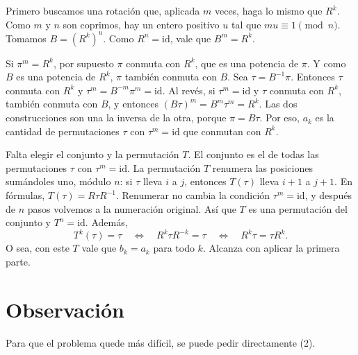 \documentclass[11pt]{amsproc}
\newcommand{\id}{\mathrm{id}}
\begin{document}
Primero buscamos una rotación que, aplicada $m$ veces, haga lo mismo que
$R^k$. Como $m$ y $n$ son coprimos, hay un entero positivo $u$ tal que
$mu\equiv 1\pmod n$. Tomamos $B=(R^k)^u$. Como $R^n=\id$, vale que
$B^m=R^k$.

Si $\pi^m=R^k$, por supuesto $\pi$ conmuta con $R^k$, que es una potencia de
$\pi$. Y como $B$ es una potencia de $R^k$, $\pi$ también conmuta con $B$. Sea
$\tau=B^{-1}\pi$. Entonces $\tau$ conmuta con $R^k$ y
$\tau^m=B^{-m}\pi^m=\id$. Al revés, si $\tau^m=\id$ y $\tau$ conmuta con
$R^k$, también conmuta con $B$, y entonces $(B\tau)^m=B^m\tau^m=R^k$. Las dos
construcciones son una la inversa de la otra, porque $\pi=B\tau$. Por eso,
$a_k$ es la cantidad de permutaciones $\tau$ con $\tau^m=\id$ que conmutan con
$R^k$.

Falta elegir el conjunto y la permutación $T$. El conjunto es el de todas las
permutaciones $\tau$ con $\tau^m=\id$. La permutación $T$ renumera las
posiciones sumándoles uno, módulo $n$: si $\tau$ lleva $i$ a $j$, entonces
$T(\tau)$ lleva $i+1$ a $j+1$. En fórmulas, $T(\tau)=R\tau R^{-1}$.
Renumerar no cambia la condición $\tau^m=\id$, y después de $n$ pasos
volvemos a la numeración original. Así que $T$ es una permutación del conjunto
y $T^n=\id$. Además,
\[
  T^k(\tau)=\tau
  \quad\Longleftrightarrow\quad R^k\tau R^{-k}=\tau
  \quad\Longleftrightarrow\quad R^k\tau=\tau R^k.
\]
O sea, con este $T$ vale que $b_k=a_k$ para todo $k$. Alcanza con aplicar la
primera parte.

\section*{Observación}

Para que el problema quede más difícil, se puede
pedir directamente (2).
\end{document}
